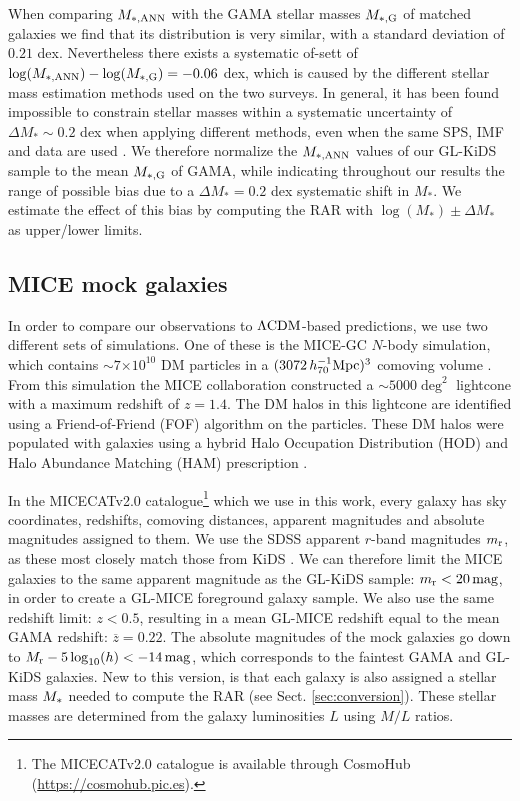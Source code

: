 \documentclass[usenatbib]{mnras}
\newcommand{\magn}{\, {\rm mag} }
\newcommand{\hsMpc}{\, h_{70}^{-1}{\rm{Mpc}} }
\newcommand{\lcdm}{{\rm \Lambda CDM}}
\newcommand*{\mean}[1]{\overline{#1}}
\newcommand*{\E}[1]{\times 10^{#1}}
\newcommand{\un}[1]{_{\rm #1}}
\begin{document}
When comparing $M\un{*,ANN}$ with the GAMA stellar masses $M\un{*,G}$ of matched galaxies we find that its distribution is very similar, with a standard deviation of $0.21$ dex. Nevertheless there exists a systematic of-sett of $\log(M\un{*,ANN}) - \log(M\un{*,G}) = -0.06$ dex, which is caused by the different stellar mass estimation methods used on the two surveys. In general, it has been found impossible to constrain stellar masses within a systematic uncertainty of $\Delta M_* \sim 0.2$ dex  when applying different methods, even when the same SPS, IMF and data are used \cite[]{taylor2011,wright2017}. We therefore normalize the $M\un{*,ANN}$ values of our GL-KiDS sample to the mean $M\un{*,G}$ of GAMA, while indicating throughout our results the range of possible bias due to a $\Delta M_*=0.2$ dex systematic shift in $M_*$. We estimate the effect of this bias by computing the RAR with $\log(M_*)\pm\Delta M_*$ as upper/lower limits.


\subsection{MICE mock galaxies}
\label{sec:mice_mocks}

In order to compare our observations to $\lcdm$-based predictions, we use two different sets of simulations. One of these is the MICE-GC $N$-body simulation, which contains $\sim 7$$\E{10}$ DM particles in a $(3072 \hsMpc)^3$ comoving volume \cite[]{fosalba2015b}. From this simulation the MICE collaboration constructed a $\sim5000\deg^2$ lightcone with a maximum redshift of $z=1.4$. The DM halos in this lightcone are identified using a Friend-of-Friend (FOF) algorithm on the particles. These DM halos were populated with galaxies using a hybrid Halo Occupation Distribution (HOD) and Halo Abundance Matching (HAM) prescription \cite[]{carretero2015,crocce2015}.

In the MICECATv2.0 catalogue\footnote{The MICECATv2.0 catalogue is available through CosmoHub (\url{https://cosmohub.pic.es}).} which we use in this work, every galaxy has sky coordinates, redshifts, comoving distances, apparent magnitudes and absolute magnitudes assigned to them. We use the SDSS apparent $r$-band magnitudes $m\un{r}$, as these most closely match those from KiDS \cite[see][]{brouwer2018}. We can therefore limit the MICE galaxies to the same apparent magnitude as the GL-KiDS sample: $m\un{r}<20 \, {\rm mag}$, in order to create a GL-MICE foreground galaxy sample. We also use the same redshift limit: $z<0.5$, resulting in a mean GL-MICE redshift equal to the mean GAMA redshift: $\mean{z}=0.22$. The absolute magnitudes of the mock galaxies go down to $M\un{r} - 5\log_{10}(h) < -14 \magn$, which corresponds to the faintest GAMA and GL-KiDS galaxies. New to this version, is that each galaxy is also assigned a stellar mass $M\un{*}$ needed to compute the RAR (see Sect. \ref{sec:conversion}). These stellar masses are determined from the galaxy luminosities $L$ using \cite{bell2001} $M/L$ ratios.
\end{document}
